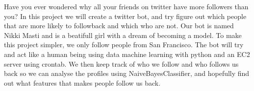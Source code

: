 Have you ever wondered why all your friends on twitter have more followers than you?
In this project we will create a twitter bot, and try figure out which people
that are more likely to followback and which who are not. Our bot is named Nikki Masti
and is a beatifull girl with a dream of becoming a model. To make this project simpler,
we only follow people from San Francisco. The bot will try and act like a human being using
data machine learning with python and an EC2 server using crontab. We then keep track
of who we follow and who follows us back so we can analyse the profiles using NaiveBayesClassifier,
and hopefully find out what features that makes people follow us back.